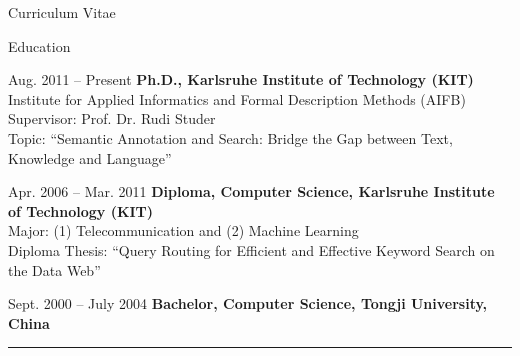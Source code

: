 \begin{cv}{\centerline{\LARGE Curriculum Vitae}}
  \begin{cvlist}{Education}
  \item[Aug. 2011 -- Present] \textbf{Ph.D., Karlsruhe Institute of Technology (KIT)}\\
    Institute for Applied Informatics and Formal Description Methods (AIFB) \\
    Supervisor: Prof. Dr. Rudi Studer\\
    Topic: ``Semantic Annotation and Search: Bridge the Gap between Text, Knowledge and Language''
  \item[Apr. 2006 -- Mar. 2011] \textbf{Diploma, Computer Science, Karlsruhe Institute of Technology (KIT)}\\
    Major: (1) Telecommunication and
	(2) Machine Learning \\
    Diploma Thesis: ``Query Routing for Efficient and Effective Keyword Search on the Data Web''
  \item[Sept. 2000 -- July 2004] \textbf{Bachelor, Computer Science, 
      Tongji University, China}\\
  \end{cvlist}

  \hrule


\end{cv}

